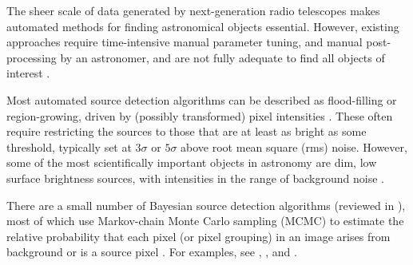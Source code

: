 \documentclass[
    ,final            %
  ]
  {aipproc}
\begin{document}
\maketitle


The sheer scale of data generated by next-generation radio telescopes makes automated methods for finding astronomical objects essential. However, existing approaches require time-intensive manual parameter tuning, and manual post-processing by an astronomer, and are not fully adequate to find all objects of interest \cite{hollitt2012feature, norris2011emu, norris2012radio}.


Most automated source detection algorithms can be described
as flood-filling or region-growing, driven by (possibly transformed)
pixel intensities \cite{masias2012review}.  These often require 
restricting the sources to those that are at least as bright as some
threshold, typically set at $3 \sigma$ or $5 \sigma$ above root mean
square (rms) noise. However, some of the most scientifically important
objects in astronomy are dim, low surface brightness sources, with
intensities in the range of background noise \cite{norris2011emu}.

There are a small number of Bayesian source detection algorithms (reviewed in \cite{masias2012review}), most of which use Markov-chain Monte Carlo sampling (MCMC) to estimate the relative probability that each pixel (or pixel grouping) in an image arises from background or is a source pixel \cite{feroz2008multimodal, masias2012review}. For examples, see \cite{savage2007bayesian}, \cite {carvalho2009fast}, and \cite{guglielmetti2009background}.  
\end{document}

